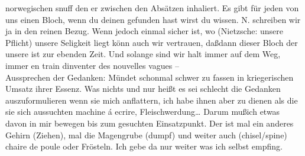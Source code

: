 \documentclass[
]{article}
\begin{document}
norwegischen snuff den er zwischen den Absätzen inhaliert. Es gibt für
jeden von uns einen Bloch, wenn du deinen gefunden hast wirst du wissen.
N. schreiben wir ja in den reinen Bezug. Wenn jedoch einmal sicher ist,
wo (Nietzsche: unsere Pflicht) unsere Seligkeit liegt könn auch wir
vertrauen, daßdann dieser Bloch der unsere ist zur ebenden Zeit. Und
solange sind wir halt immer auf dem Weg, immer en train
d\textquotesingle inventer des nouvelles vagues --\\
Aussprechen der Gedanken: Mündet schonmal schwer zu fassen in
kriegerischen Umsatz ihrer Essenz. Was nichts und nur heißt es sei
schlecht die Gedanken auszuformulieren wenn sie mich anflattern, ich
habe ihnen aber zu dienen als die sie sich aussuchten machine á ecrire,
Fleischwerdung\ldots{} Darum mußich etwas davon in mir bewegen bis zum
gesuchten Einsatzpunkt. Der ist mal ein anderes Gehirn (Ziehen), mal die
Magengrube (dumpf) und weiter auch (chisel/spine) chaire de poule oder
Frösteln. Ich gebe da nur weiter was ich selbst empfing.
\end{document}
